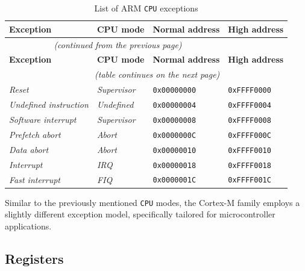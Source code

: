 \documentclass[english, ing, kiv, he, iso690numb, pdf]{fasthesis}
\begin{document}
	\begin{center}
		\begin{longtable}{p{}p{}p{}p{}}
			\caption{List of ARM \texttt{CPU} exceptions}
			\label{List of ARM CPU exceptions}\\
			\toprule[1.5pt]
			\textbf{Exception} & \textbf{CPU mode} & \textbf{Normal address} & \textbf{High address}\\
			\midrule
			\endfirsthead
			\multicolumn{3}{c}{\tablename{}~\thetable{} \textit{(continued from the previous page)}}\\
			\midrule
			\textbf{Exception} & \textbf{CPU mode} & \textbf{Normal address} & \textbf{High address}\\
			\midrule
			\endhead
			\midrule
			\multicolumn{3}{r}{\textit{(table continues on the next page)}}\\
			\endfoot
			\bottomrule[1.5pt]
			\endlastfoot
			\textit{Reset} & \textit{Supervisor} & \texttt{0x00000000} & \texttt{0xFFFF0000}\\
			\textit{Undefined instruction} & \textit{Undefined} & \texttt{0x00000004} & \texttt{0xFFFF0004}\\
			\textit{Software interrupt} & \textit{Supervisor} & \texttt{0x00000008} & \texttt{0xFFFF0008}\\
			\textit{Prefetch abort} & \textit{Abort} & \texttt{0x0000000C} & \texttt{0xFFFF000C}\\
			\textit{Data abort} & \textit{Abort} & \texttt{0x00000010} & \texttt{0xFFFF0010}\\
			\textit{Interrupt} & \textit{IRQ} & \texttt{0x00000018} & \texttt{0xFFFF0018}\\
			\textit{Fast interrupt} & \textit{FIQ} & \texttt{0x0000001C} & \texttt{0xFFFF001C}\\
		\end{longtable}
	\end{center}
	
	\begin{important}
		Similar to the previously mentioned \texttt{CPU} modes, the Cortex-M family employs a slightly different exception model, specifically tailored for microcontroller applications.
	\end{important}
	
	\subsection{Registers}
	
\end{document}
